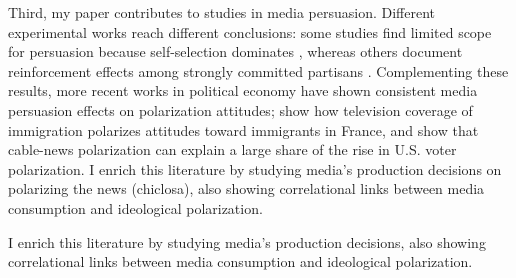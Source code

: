 \documentclass[12pt]{article}
\begin{document}
	
Third, my paper contributes to studies in media persuasion. Different experimental works reach different conclusions: some studies find limited scope for persuasion because self-selection dominates \citep{arceneaux_johnson_2013}, whereas others document reinforcement effects among strongly committed partisans \citep{levendusky}. Complementing these results, more recent works in political economy  have shown consistent media persuasion effects on polarization attitudes; \citet{schneider2025media} show how television coverage of immigration polarizes attitudes toward immigrants in France, and \citet{martin2017} show that cable-news polarization can explain a large share of the rise in U.S. voter polarization. I enrich this literature by studying media's production decisions on polarizing the news (chiclosa), also showing correlational links between media consumption and ideological polarization.


I enrich this literature by studying media's production decisions, also showing correlational links between media consumption and ideological polarization.


	
	
	
	
	
	
	
	
	
	
	
\end{document}
